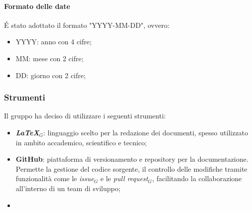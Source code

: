    \paragraph{Formato delle date}
    \'E stato adottato il formato "YYYY-MM-DD", ovvero:
    \begin{itemize}
        \item YYYY: anno con 4 cifre;
        \item MM: mese con 2 cifre;
        \item DD: giorno con 2 cifre;
    \end{itemize}

\subsubsection{Strumenti}
Il gruppo ha deciso di utilizzare i seguenti strumenti:
\begin{itemize}
    \item  \textbf{\textit{LaTeX}}$_G$: linguaggio scelto per la redazione dei documenti, spesso utilizzato in ambito accademico, scientifico e tecnico;
    \item  \textbf{GitHub}: piattaforma di versionamento e repository per la documentazione. Permette la gestione del codice sorgente, il controllo delle modifiche tramite funzionalità come le \textit{issue}$_G$ e le \textit{pull request}$_G$, facilitando la collaborazione all’interno di un team di sviluppo;
    \item 
\end{itemize}
